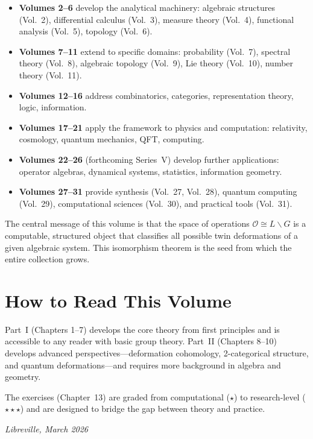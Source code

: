 \documentclass[11pt,a4paper,openany]{book}
\theoremstyle{plain}
\theoremstyle{definition}
\newcommand{\opspace}{\mathcal{O}}
\newcommand{\lingroup}{L}
\newcommand{\groupG}{G}
\begin{document}
\begin{itemize}
\item \textbf{Volumes 2--6} develop the analytical machinery: algebraic structures (Vol.~2), differential calculus (Vol.~3), measure theory (Vol.~4), functional analysis (Vol.~5), topology (Vol.~6).
\item \textbf{Volumes 7--11} extend to specific domains: probability (Vol.~7), spectral theory (Vol.~8), algebraic topology (Vol.~9), Lie theory (Vol.~10), number theory (Vol.~11).
\item \textbf{Volumes 12--16} address combinatorics, categories, representation theory, logic, information.
\item \textbf{Volumes 17--21} apply the framework to physics and computation: relativity, cosmology, quantum mechanics, QFT, computing.
\item \textbf{Volumes 22--26} (forthcoming Series~V) develop further applications: operator algebras, dynamical systems, statistics, information geometry.
\item \textbf{Volumes 27--31} provide synthesis (Vol.~27, Vol.~28), quantum computing (Vol.~29), computational sciences (Vol.~30), and practical tools (Vol.~31).
\end{itemize}

The central message of this volume is that the space of operations $\opspace \cong \lingroup\backslash\groupG$ is a computable, structured object that classifies all possible twin deformations of a given algebraic system. This isomorphism theorem is the seed from which the entire collection grows.

\section*{How to Read This Volume}

Part~I (Chapters 1--7) develops the core theory from first principles and is accessible to any reader with basic group theory. Part~II (Chapters 8--10) develops advanced perspectives---deformation cohomology, 2-categorical structure, and quantum deformations---and requires more background in algebra and geometry.

The exercises (Chapter~13) are graded from computational ($\star$) to research-level ($\star\star\star$) and are designed to bridge the gap between theory and practice.

\vspace{1em}
\hfill\textit{Libreville, March 2026}
\end{document}

